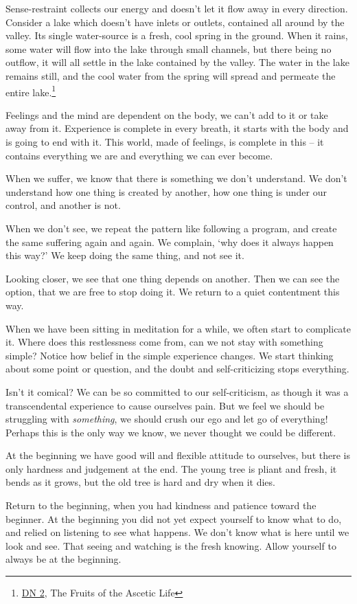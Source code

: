 Sense-restraint collects our energy and doesn't let it flow away in
every direction. Consider a lake which doesn't have inlets or outlets,
contained all around by the valley. Its single water-source is a fresh,
cool spring in the ground. When it rains, some water will flow into the
lake through small channels, but there being no outflow, it will all
settle in the lake contained by the valley. The water in the lake
remains still, and the cool water from the spring will spread and
permeate the entire lake.\footnote{\href{https://suttacentral.net/dn2}{DN
  2}, The Fruits of the Ascetic Life}

\clearpage

Feelings and the mind are dependent on the body, we can't add to it or
take away from it. Experience is complete in every breath, it starts
with the body and is going to end with it. This world, made of feelings,
is complete in this -- it contains everything we are and everything we
can ever become.


When we suffer, we know that there is something we don't understand. We
don't understand how one thing is created by another, how one thing is
under our control, and another is not.

When we don't see, we repeat the pattern like following a program, and
create the same suffering again and again. We complain, `why does it
always happen this way?' We keep doing the same thing, and not see it.

Looking closer, we see that one thing depends on another. Then we can
see the option, that we are free to stop doing it. We return to a quiet
contentment this way.


When we have been sitting in meditation for a while, we often start to
complicate it. Where does this restlessness come from, can we not stay
with something simple? Notice how belief in the simple experience
changes. We start thinking about some point or question, and the doubt
and self-criticizing stops everything.

Isn't it comical? We can be so committed to our self-criticism, as
though it was a transcendental experience to cause ourselves pain. But
we feel we should be struggling with \emph{something}, we should crush
our ego and let go of everything! Perhaps this is the only way we know,
we never thought we could be different.

\clearpage

At the beginning we have good will and flexible attitude to ourselves,
but there is only hardness and judgement at the end. The young tree is
pliant and fresh, it bends as it grows, but the old tree is hard and dry
when it dies.

Return to the beginning, when you had kindness and patience toward the
beginner. At the beginning you did not yet expect yourself to know what
to do, and relied on listening to see what happens. We don't know what
is here until we look and see. That seeing and watching is the fresh
knowing. Allow yourself to always be at the beginning.
